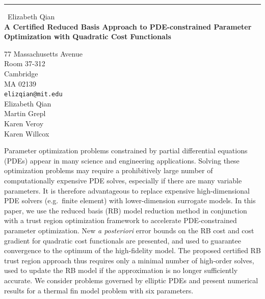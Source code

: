 \documentclass{report}
\begin{document}
\begin{center}
\rule{6in}{1pt} \
{\large Elizabeth Qian \\
{\bf A Certified Reduced Basis Approach to PDE-constrained Parameter Optimization with Quadratic Cost Functionals}}

77 Massachusetts Avenue \\ Room 37-312 \\ Cambridge \\ MA 02139
\\
{\tt elizqian@mit.edu}\\
Elizabeth Qian\\
Martin Grepl\\
Karen Veroy\\
Karen Willcox\end{center}

Parameter optimization problems constrained by partial differential
equations (PDEs) appear in many science and engineering applications.
Solving these optimization problems may require a prohibitively large
number of computationally expensive PDE solves, especially if there are
many variable parameters. It is therefore advantageous to replace
expensive high-dimensional PDE solvers (e.g.\ finite element) with
lower-dimension surrogate models. In this paper, we use the reduced basis
(RB) model reduction method in conjunction with a trust region
optimization framework to accelerate PDE-constrained parameter
optimization. New \emph{a posteriori }error bounds on the RB cost and
cost gradient for quadratic cost functionals are presented, and used to
guarantee convergence to the optimum of the high-fidelity model. The
proposed certified RB trust region approach thus requires only a minimal
number of high-order solves, used to update the RB model if the
approximation is no longer sufficiently accurate. We consider problems
governed by elliptic PDEs and present numerical results for a thermal fin
model problem with six parameters.
\end{document}
